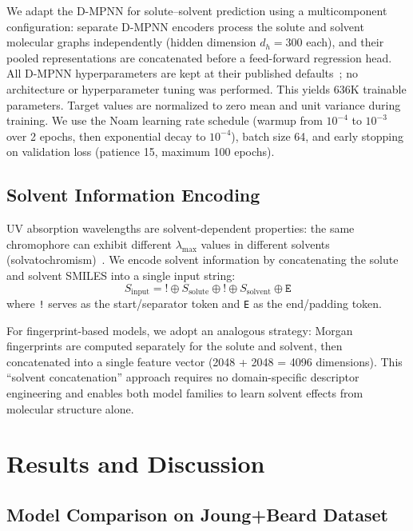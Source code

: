 \documentclass[11pt,a4paper]{article}
\begin{document}
We adapt the D-MPNN for solute--solvent prediction using a multicomponent configuration: separate D-MPNN encoders process the solute and solvent molecular graphs independently (hidden dimension $d_h = 300$ each), and their pooled representations are concatenated before a feed-forward regression head.
All D-MPNN hyperparameters are kept at their published defaults~\cite{yangAnalyzingLearnedMolecular2019}; no architecture or hyperparameter tuning was performed.
This yields 636K trainable parameters.
Target values are normalized to zero mean and unit variance during training.
We use the Noam learning rate schedule (warmup from $10^{-4}$ to $10^{-3}$ over 2 epochs, then exponential decay to $10^{-4}$), batch size 64, and early stopping on validation loss (patience 15, maximum 100 epochs).


\subsection{Solvent Information Encoding}
\label{sec:solvent}

UV absorption wavelengths are solvent-dependent properties: the same chromophore can exhibit different $\lambda_{\max}$ values in different solvents (solvatochromism)~\cite{reichardt2011solvents}.
We encode solvent information by concatenating the solute and solvent SMILES into a single input string:
\begin{equation}
    S_{\text{input}} = \texttt{!} \oplus S_{\text{solute}} \oplus \texttt{!} \oplus S_{\text{solvent}} \oplus \texttt{E}
\end{equation}
where \texttt{!} serves as the start/separator token and \texttt{E} as the end/padding token.

For fingerprint-based models, we adopt an analogous strategy: Morgan fingerprints are computed separately for the solute and solvent, then concatenated into a single feature vector (2048 + 2048 = 4096 dimensions).
This ``solvent concatenation'' approach requires no domain-specific descriptor engineering and enables both model families to learn solvent effects from molecular structure alone.


\section{Results and Discussion}
\label{sec:results}

\subsection{Model Comparison on Joung+Beard Dataset}
\label{sec:model_comparison}
\end{document}
